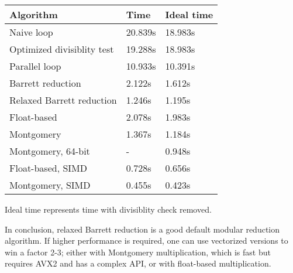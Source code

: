 \vspace{1mm}
\noindent
\begin{tabular}{|l|l|l|}
\hline
Algorithm & Time & Ideal time \\
\hline
Naive loop & 20.839s & 18.983s \\
Optimized divisiblity test & 19.288s & 18.983s \\
Parallel loop & 10.933s & 10.391s \\
Barrett reduction & 2.122s & 1.612s \\
Relaxed Barrett reduction & 1.246s & 1.195s \\
Float-based & 2.078s & 1.983s \\
Montgomery & 1.367s & 1.184s \\
Montgomery, 64-bit & - & 0.948s \\
Float-based, SIMD & 0.728s & 0.656s \\
Montgomery, SIMD & 0.455s & 0.423s \\
\hline
\end{tabular}
\vspace{1mm}

\noindent
Ideal time represents time with divisiblity check removed.

In conclusion, relaxed Barrett reduction is a good default modular reduction algorithm.
If higher performance is required, one can use vectorized versions to win a factor 2-3; either with
Montgomery multiplication, which is fast but requires AVX2 and has a complex API, or with
float-based multiplication.
